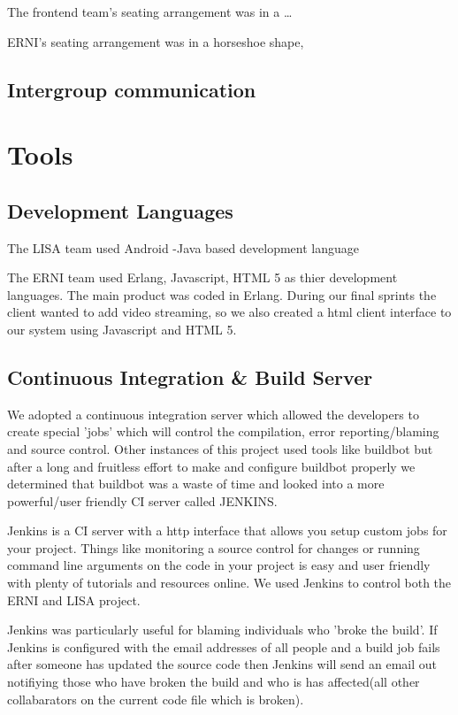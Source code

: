 \documentclass[11pt]{report}
\begin{document}
The frontend team's seating arrangement was in a \ldots

ERNI's seating arrangement was in a horseshoe shape, 

\subsection{Intergroup communication}
\section{Tools}
\subsection{Development Languages}

The LISA team used Android -Java based development language

The ERNI team used Erlang, Javascript, HTML 5  as thier development languages. The main product was coded in Erlang. During our final sprints the client wanted to add video streaming, so we also created a html client interface to our system using Javascript and HTML 5. 


\subsection{Continuous Integration \& Build Server}

We adopted a continuous integration server which allowed the developers to create special 'jobs' which will control the compilation, error reporting/blaming and source control. Other instances of this project used tools like buildbot but after a long and fruitless effort to make and configure buildbot properly we determined that buildbot was a waste of time and looked into a more powerful/user friendly CI server called JENKINS. 

Jenkins is a CI server with a http interface that allows you setup custom jobs for your project. Things like monitoring a source control for changes or running command line arguments on the code in your project is easy and user friendly with plenty of tutorials and resources online. We used Jenkins to control both the ERNI and LISA project. 

Jenkins was particularly useful for blaming individuals who 'broke the build'. If Jenkins is configured with the email addresses of all people and a build job fails after someone has updated the source code then Jenkins will send an email out notifiying those who have broken the build and who is has affected(all other collabarators on the current code file which is broken).
\end{document}
